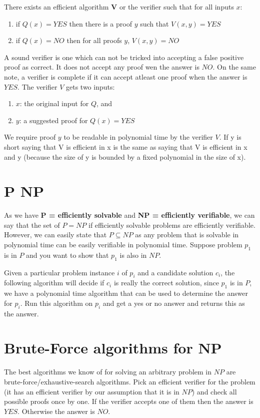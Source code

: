 There exists an efficient algorithm $\textbf{V}$ or the verifier such that for all inputs $x$:
\begin{enumerate}
    \item if $Q(x) = YES$ then there is a proof $y$ such that $V(x,y) = YES$
    \item if $Q(x) = NO$ then for all proofs $y$, $V(x,y) = NO$
\end{enumerate}

A sound verifier is one which can not be tricked into accepting a false positive proof as correct. It does not accept any proof wen the answer is $NO$. On the same note, a verifier is complete if it can accept atleast one proof when the answer is $YES$. The verifier $V$ gets two inputs:

\begin{enumerate}
    \item $x$: the original input for $Q$, and
    \item $y$: a suggested proof for $Q(x) = YES$
\end{enumerate}

We require proof $y$ to be readable in polynomial time by the verifier $V$. If y is short saying that V is efficient in x is the same as saying that V is efficient in x and y (because the size of y is bounded by a fixed polynomial in the size of x).

\section{P \subseteq NP}
As we have \textbf{P = efficiently solvable} and \textbf{NP = efficiently verifiable}, we can say that the set of $P = NP$ if efficiently solvable problems are efficiently verifiable. However, we can easily state that $P \subseteq NP$ as any problem that is solvable in polynomial time can be easily verifiable in polynomial time. Suppose problem $p_1$ is in $P$ and you want to show that $p_1$ is also in $NP$.

Given a particular problem instance $i$ of $p_i$ and a candidate solution $c_i$, the following algorithm will decide if $c_i$ is really the correct solution, since $p_1$ is in $P$, we have a polynomial time algorithm that can be used to determine the answer for $p_i$. Run this algorithm on $p_i$ and get a yes or no answer and returns this as the answer.

\section{Brute-Force algorithms for NP}
The best algorithms we know of for solving an arbitrary problem in $NP$ are brute-force/exhaustive-search algorithms. Pick an efficient verifier for the problem (it has an efficient verifier by our assumption that it is in $NP$) and check all possible proofs once by one. If the verifier accepts one of them then the answer is $YES$. Otherwise the answer is $NO$.

